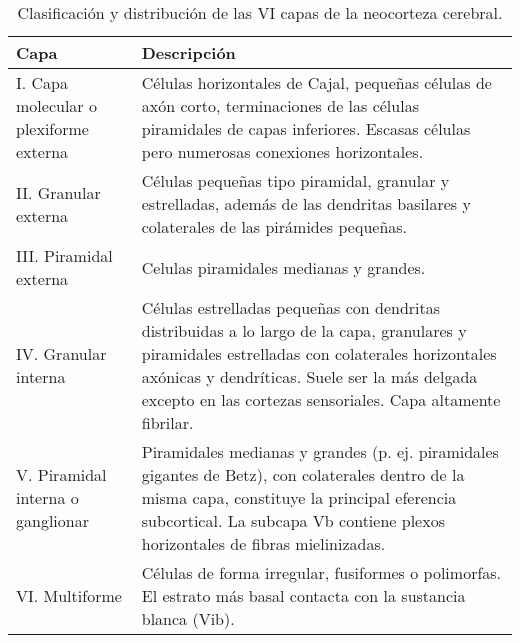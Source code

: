 \begin{table}[]
\centering
\caption{Clasificación  y distribución de las VI capas de la neocorteza cerebral.}
\label{tab:capas_corticales}
\begin{tabular}{p{} p{}}
\toprule
Capa                          & Descripción                                                                                                                                                                                                                                            \\ \midrule
I. Capa molecular o plexiforme externa & Células horizontales de Cajal, pequeñas células de axón corto, terminaciones de las células piramidales de capas inferiores. Escasas células pero numerosas conexiones horizontales.                                                                            \\
II. Granular externa                   & Células pequeñas tipo piramidal, granular y estrelladas, además de las dendritas basilares y colaterales de las pirámides pequeñas.                                                                                                                             \\
III. Piramidal externa                 & Celulas piramidales medianas y grandes.                                                                                                                                                                                                                         \\
IV. Granular interna                   & Células estrelladas pequeñas con dendritas distribuidas a lo largo de la capa, granulares y piramidales estrelladas con colaterales horizontales axónicas y dendríticas. Suele ser la más delgada excepto en las cortezas sensoriales. Capa altamente fibrilar. \\
V. Piramidal interna o ganglionar      & Piramidales medianas y grandes (p. ej. piramidales gigantes de Betz), con colaterales dentro de la misma capa, constituye la principal eferencia subcortical. La subcapa Vb contiene plexos horizontales de fibras mielinizadas.                                  \\
VI. Multiforme                         & Células de forma irregular, fusiformes o polimorfas. El estrato más basal contacta con  la sustancia blanca (Vib).                                                                                                                                              \\ \bottomrule
\end{tabular}
\end{table}